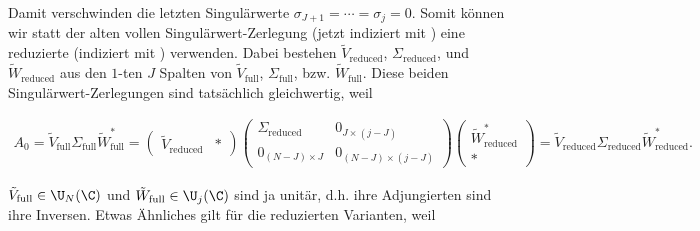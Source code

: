 Damit verschwinden die letzten Singulärwerte $\sigma_{J+1} = \cdots = \sigma_j = 0$.
Somit können wir statt der alten vollen Singulärwert-Zerlegung (jetzt indiziert mit ) eine reduzierte (indiziert mit ) verwenden.
Dabei bestehen $\tilde V_\mathrm{reduced}$, $\Sigma_\mathrm{reduced}$, und $\tilde W_\mathrm{reduced}$ aus den $1$-ten $J$ Spalten von $\tilde V_\mathrm{full}$, $\Sigma_\mathrm{full}$, bzw. $\tilde W_\mathrm{full}$.
Diese beiden Singulärwert-Zerlegungen sind tatsächlich gleichwertig, weil

\begin{align*}
    A_0
    =
    \tilde V_\mathrm{full} \Sigma_\mathrm{full} \tilde W_\mathrm{full}^\ast
    =
    \begin{pmatrix}
        \tilde V_\mathrm{reduced} & \ast
    \end{pmatrix}
    \begin{pmatrix}
        \Sigma_\mathrm{reduced} & 0_{J \times (j - J)}       \\
        0_{(N - J) \times J}    & 0_{(N - J) \times (j - J)}
    \end{pmatrix}
    \begin{pmatrix}
        \tilde W_\mathrm{reduced}^\ast \\ \ast
    \end{pmatrix}
    =
    \tilde V_\mathrm{reduced} \Sigma_\mathrm{reduced} \tilde W_\mathrm{reduced}^\ast.
\end{align*}

$\tilde V_\mathrm{full} \in \U_N(\C)$ und $\tilde W_\mathrm{full} \in \U_j(\C)$ sind ja unitär, d.h. ihre Adjungierten sind ihre Inversen.
Etwas Ähnliches gilt für die reduzierten Varianten, weil

